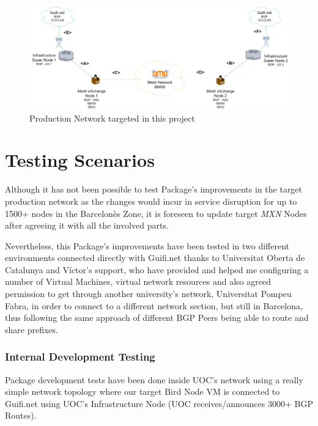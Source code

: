 \begin{landscape}

\begin{figure}[ht!]
    \centering
    \includegraphics[width=\hsize]{images/targetnet}
    \caption{Production Network targeted in this project}
    \label{fig:tarnet}
\end{figure}
\end{landscape}
\newpage

\section{Testing Scenarios}
Although it has not been possible to test Package's improvements in the target production network as the changes would incur in service disruption for up to 1500+ nodes in the Barcelon\`{e}s Zone, it is foreseen to update target \textit{MXN} Nodes after agreeing it with all the involved parts.

Nevertheless, this Package's improvements have been tested in two different environments connected directly with Guifi.net thanks to Universitat Oberta de Catalunya and V\'{i}ctor's support, who have provided and helped me configuring a number of Virtual Machines, virtual network resources and also agreed permission to get through another university's network, Universitat Pompeu Fabra, in order to connect to a different network section, but still in Barcelona, thus following the same approach of different BGP Peers being able to route and share prefixes. 

\subsubsection{Internal Development Testing}
Package development tests have been done inside UOC's network using a really simple network topology where our target Bird Node VM is connected to Guifi.net using UOC's Infrastructure Node (UOC receives/announces 3000+ BGP Routes). 

